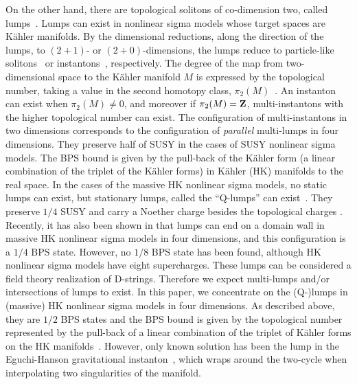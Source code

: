 \documentclass[a4paper,12pt]{article}
\newcommand{\kahler}{K\"{a}hler }
\begin{document}
On the other hand, there are 
topological solitons of co-dimension two, called lumps~\cite{Ward}. 
Lumps can exist in nonlinear sigma models 
whose target spaces are \kahler manifolds. 
By the dimensional reductions, 
along the direction of the lumps,  
to $(2+1)$- or $(2+0)$-dimensions, 
the lumps reduce to particle-like solitons~\cite{Ward} 
or instantons~\cite{BP}, respectively. 
The degree of the map from two-dimensional space to 
the \kahler manifold $M$ is expressed by 
the topological number, taking a value in 
the second homotopy class, $\pi_2(M)$~\cite{BP,Perelomov}. 
An instanton can exist when $\pi_2(M) \neq 0$, 
and moreover if $\pi_2(M) = {\bf Z}$, 
multi-instantons with the higher topological number can exist. 
The configuration of multi-instantons in two dimensions 
corresponds to the configuration of 
{\it parallel} multi-lumps in four dimensions. 
They preserve half of SUSY in the cases of 
SUSY nonlinear sigma models.  
The BPS bound is given by 
the pull-back of the \kahler form 
(a linear combination of 
the triplet of the \kahler forms) 
in \kahler (HK) manifolds to the real space.  
In the cases of the massive HK nonlinear sigma models, 
no static lumps can exist, 
but stationary lumps, called the ``Q-lumps'' 
can exist~\cite{Leese,Abraham}. 
They preserve $1/4$ SUSY and 
carry a Noether charge besides the topological charges \cite{Townsend2}. 
Recently, it has also been shown in \cite{Townsend2} 
that lumps can end on a domain wall in massive HK nonlinear sigma models 
in four dimensions, 
and this configuration is a $1/4$ BPS state. 
However, no $1/8$ BPS state has been found, 
although HK nonlinear sigma models have eight supercharges.  
These lumps can be considered a field theory realization of D-strings. 
Therefore we expect multi-lumps and/or intersections of lumps to exist. 
In this paper, we concentrate on the (Q-)lumps 
in (massive) HK nonlinear sigma models in four dimensions. 
As described above, they are $1/2$ BPS states 
and the BPS bound is given by 
the topological number represented by  
the pull-back of a linear combination of 
the triplet of \kahler forms on the HK manifolds~\cite{Ruback}. 
However, only known solution has been the lump in 
the Eguchi-Hanson gravitational instanton~\cite{EH}, 
which wraps around the two-cycle when interpolating two singularities of 
the manifold.  
\end{document}
